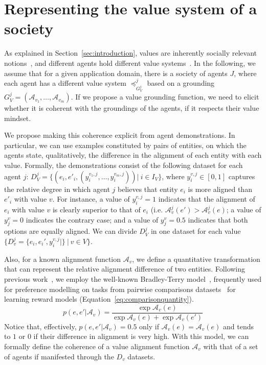 \documentclass{ecai}
\newcommand{\A}{\mathcal{A}}
\begin{document}
\section{Representing the value system of a society}

As explained in Section~\ref{sec:introduction}, values are inherently socially relevant notions~\cite{schwartz1992universals,valueengineeringAutonomous2023,Osman2024}, and different agents hold different value systems~\cite{AaronAgreementTOPSIS,leraleri2024aggregation,Serramia2018}. In the following, we assume that for a given application domain, there is a society of agents $J$, where each agent has a different value system $\preccurlyeq_{G^j_V}^j$ based on a grounding $G^j_V = \left(\A_{v_1},\dots, \A_{v_m}\right)$. If we propose a value grounding function, we need to elicit whether it is coherent with the groundings of the agents, if it respects their value mindset.


We propose making this coherence explicit from agent demonstrations. In particular, we can use examples constituted by pairs of entities, on which the agents state, qualitatively, the difference in the alignment of each entity with each value. Formally, the demonstrations consist of the following dataset for each agent $j$: $D_V^j = \{(e_i, e'_i, (y_i^{v_1,j}, \dots,y_i^{v_m, j}))|\ i\in I_V\}$, where $y^{v,j}_i \in [0,1]$ captures the relative degree in which agent $j$ believes that entity $e_i$ is more aligned than $e'_i$ with value $v$. For instance, a value of $y^{v,j}_i=1$ indicates that the alignment of $e_i$ with value $v$ is clearly superior to that of $e_i$ (i.e. $\mathcal{A}^j_v(e') > \mathcal{A}^j_v(e)$; a value of $y^{v}_j=0$ indicates the contrary case; and a value of $y^{v}_j=0.5$ indicates that both options are equally aligned. We can divide $D_V^j$ in one dataset for each value $\{D_v^j = \{e_i,e_i',y^{v,j}_i|\} \ |\  v\in V\}$. 

Also, for a known alignment function $\A_v$, we define a quantitative transformation that can represent the relative alignment difference of two entities. Following previous work~\cite{andres2024vecompPaper}, we employ the well-known Bradley-Terry model~\cite{bradleyTerryModel1952}, frequently used for preference modelling on tasks from pairwise comparisons datasets~\cite{trexpreferences2019,christiano2023deeprlpreferences,dpoLLM2023} for learning reward models (Equation~\ref{eq:comparisonquantity}).
\begin{equation}\label{eq:comparisonquantity}
p(e,e'|\A_v) = \frac{\exp{\A_{v}(e)}}{\exp{\A_{v}(e)}+ \exp{\A_{v}(e')}}
\end{equation}
Notice that, effectively, $p(e,e'|\A_v) = 0.5$ only if $\A_{v}(e) = \A_{v}(e)$ and tends to $1$ or $0$ if their difference in alignment is very high. With this model, we can formally define the coherence of a value alignment function $\A_v$ with that of a set of agents if manifested through the $D_v$ datasets.
\end{document}
